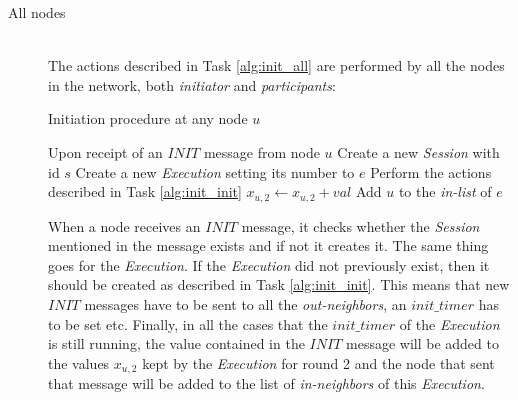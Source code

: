 \documentclass[a4paper,11pt,twoside]{report}
\begin{document}
\begin{description}
	\item[All nodes] \hfill \\
	The actions described in Task \ref{alg:init_all} are performed by all the nodes in the network, both \textit{initiator} and \textit{participants}:
		\begin{algorithm}
			\caption{Initiation procedure at any node $u$}
			\label{alg:init_all}
			\begin{algorithmic}[1]
			\STATE Upon receipt of an $INIT$ message from node $u$
			\STATE  Create a new \textit{Session} with id $s$
			\ENDIF
			\STATE Create a new \textit{Execution} setting its number to $e$
			\STATE Perform the actions described in Task \ref{alg:init_init}
			\ENDIF
			\STATE $x_{u,2} \leftarrow x_{u,2}+val$
			\STATE Add $u$ to the \textit{in-list} of $e$
			\ENDIF
			\end{algorithmic}
			\end{algorithm}
	
	 When a node receives an $INIT$ message, it checks whether the \textit{Session} mentioned in the message exists and if not it creates it. The same thing goes for the \textit{Execution}. If the \textit{Execution} did not previously exist, then it should be created as described in Task \ref{alg:init_init}. This means that new $INIT$ messages have to be sent to all the \textit{out-neighbors}, an $init\_timer$ has to be set etc. Finally, in all the cases that the  $init\_timer$ of the \textit{Execution} is still running, the value contained in the $INIT$ message will be added to the values $x_{u,2}$ kept by the \textit{Execution} for round 2 and the node that sent that message will be added to the list of \textit{in-neighbors} of this \textit{Execution}.
	

	
\end{description}
\end{document}
